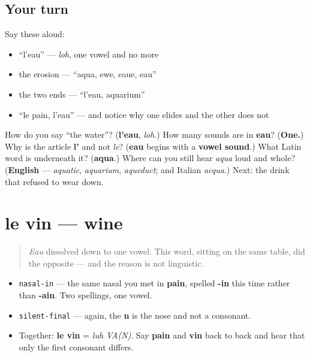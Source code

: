 \subsection*{Your turn}
Say these aloud:

\begin{itemize}
\raggedright
  \item \textquotedblleft{}l'eau\textquotedblright{} — \emph{loh}, one vowel and no more
  \item the erosion — \textquotedblleft{}aqua, ewe, eaue, eau\textquotedblright{}
  \item the two ends — \textquotedblleft{}l'eau, aquarium\textquotedblright{}
  \item \textquotedblleft{}le pain, l'eau\textquotedblright{} — and notice why one elides and the other does not
\end{itemize}

\begin{tcolorbox}[breakable,colback=teal!4,colframe=teal!35!black,title={Before you move on}]
How do you say \textquotedblleft{}the water\textquotedblright{}? (\textbf{l'eau}, \emph{loh}.) How many sounds are in \textbf{eau}? (\textbf{One.}) Why is the article \textbf{l'} and not \emph{le}? (\textbf{eau} begins with a \textbf{vowel sound}.) What Latin word is underneath it? (\textbf{aqua}.) Where can you still hear \emph{aqua} loud and whole? (\textbf{English} — \emph{aquatic}, \emph{aquarium}, \emph{aqueduct}; and Italian \emph{acqua}.) Next: the drink that refused to wear down.
\end{tcolorbox}
\section[le vin]{le vin — wine}

\label{lesson:FR-C11-vin}



\begin{quote}
\emph{Eau} dissolved down to one vowel. This word, sitting on the same table, did the opposite — and the reason is not linguistic.
\end{quote}

\begin{sounds}
\begin{itemize}
\raggedright
  \item \texttt{nasal-in} — the same nasal you met in \textbf{pain}, spelled \textbf{-in} this time rather than \textbf{-ain}. Two spellings, one vowel.
  \item \texttt{silent-final} — again, the \textbf{n} is the nose and not a consonant.
  \item Together: \textbf{le vin} = \emph{luh VA(N)}. Say \textbf{pain} and \textbf{vin} back to back and hear that only the first consonant differs.
\end{itemize}
\end{sounds}

